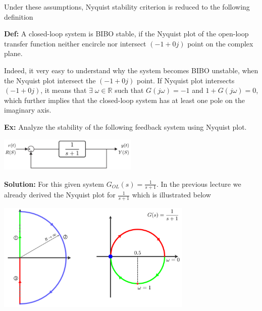 \documentclass{article}
\begin{document}
Under these assumptions, Nyquist stability criterion is reduced to the
following definition 

\vspace{3pt}

\textbf{Def:} A closed-loop system is BIBO stable, if the Nyquist plot
of the open-loop transfer function neither encircle nor intersect $(-1
+ 0 j )$ point on the complex plane. 

\vspace{3pt}

Indeed, it very easy to understand why the system becomes BIBO
unstable, when the Nyquist plot intersect the $(-1 + 0 j )$ point. If
Nyquist plot intersects $(-1 + 0 j )$, it means that $\exists \;
\omega \in \mathbb{R}$ such that $G(j \omega) = -1$ and $1 + G(j \omega) = 0$, 
which further implies that the closed-loop system has at least one 
pole on the imaginary axis. 

\newpage

\textbf{Ex:} Analyze the stability of the following feedback system
using Nyquist plot.

\vspace{6 pt}

  \begin{minipage}[h]{1\linewidth}
    \begin{center}
      \includegraphics[width=0.5\textwidth]{figs/ex1block}
    \end{center}
  \end{minipage}

\vspace{6 pt}

\textbf{Solution:} For this given system $G_{OL}(s) = \frac{1}{s+1}$.
In the previous lecture we already derived the Nyquist plot for $\frac{1}{s+1}$
which is illustrated below

\vspace{6 pt}

  \begin{minipage}[h]{1\linewidth}
    \begin{center}
      \includegraphics[width=0.7\textwidth]{figs/ex2}
    \end{center}
  \end{minipage}
\end{document}
